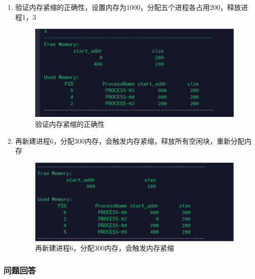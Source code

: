 \documentclass{article}
\begin{document}
\begin{enumerate}
        \item 验证内存紧缩的正确性，设置内存为1000，分配五个进程各占用200，释放进程1，3
        \newpage
        \begin{figure}[htbp]
            \centering
            \includegraphics[scale=0.8]{picture/23.png}
            \caption{验证内存紧缩的正确性}
            \label{23}
        \end{figure}

        \item 再新建进程6，分配300内存，会触发内存紧缩，释放所有空闲块，重新分配内存
        
        \begin{figure}[htbp]
            \centering
            \includegraphics[scale=0.8]{picture/24.png}
            \caption{再新建进程6，分配300内存，会触发内存紧缩}
            \label{24}
        \end{figure}
    
    \end{enumerate}
    \subsubsection{问题回答}
\end{document}
